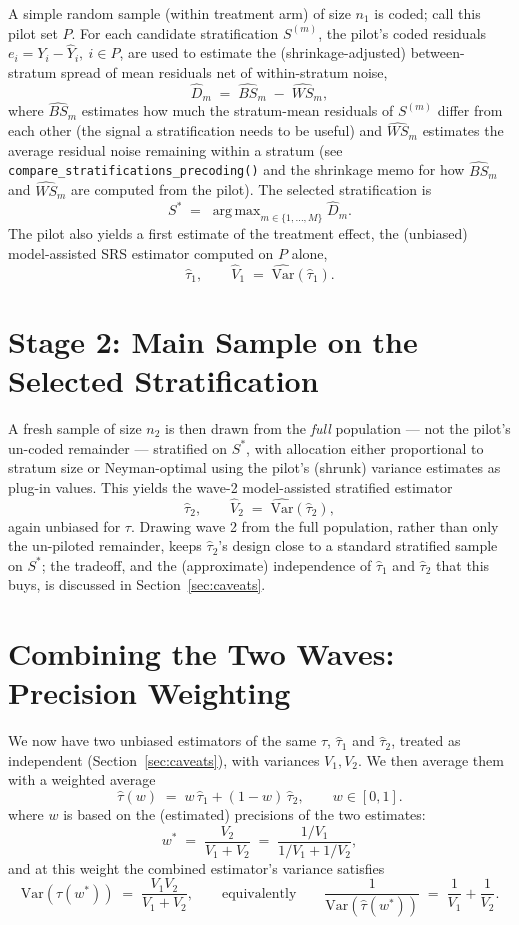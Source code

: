 \documentclass[12pt]{article}
\newcommand{\Var}{\mathrm{Var}}
\newcommand{\tauhat}{\hat\tau}
\DeclareMathOperator*{\argmax}{arg\,max}
\begin{document}
A simple random sample (within treatment arm) of size $n_1$ is coded; call this pilot set $P$.
For each candidate stratification $S^{(m)}$, the pilot's coded residuals $e_i = Y_i - \hat Y_i,\ i \in P$, are used to estimate the (shrinkage-adjusted) between-stratum spread of mean residuals net of within-stratum noise,
\[
  \hat D_m \;=\; \widehat{BS}_m \;-\; \widehat{WS}_m,
\]
where $\widehat{BS}_m$ estimates how much the stratum-mean residuals of $S^{(m)}$ differ from each other (the signal a stratification needs to be useful) and $\widehat{WS}_m$ estimates the average residual noise remaining within a stratum (see \texttt{compare\_stratifications\_precoding()} and the shrinkage memo for how $\widehat{BS}_m$ and $\widehat{WS}_m$ are computed from the pilot).
The selected stratification is
\[
  S^\ast \;=\; \argmax_{m \in \{1,\dots,M\}} \hat D_m .
\]
The pilot also yields a first estimate of the treatment effect, the (unbiased) model-assisted SRS estimator computed on $P$ alone,
\[
  \tauhat_1, \qquad \hat V_1 \;=\; \widehat{\Var}(\tauhat_1).
\]


\section{Stage 2: Main Sample on the Selected Stratification}
\label{sec:stage2}

A fresh sample of size $n_2$ is then drawn from the \emph{full} population --- not the pilot's un-coded remainder --- stratified on $S^\ast$, with allocation either proportional to stratum size or Neyman-optimal using the pilot's (shrunk) variance estimates as plug-in values.
This yields the wave-2 model-assisted stratified estimator
\[
  \tauhat_2, \qquad \hat V_2 \;=\; \widehat{\Var}(\tauhat_2),
\]
again unbiased for $\tau$.
Drawing wave 2 from the full population, rather than only the un-piloted remainder, keeps $\tauhat_2$'s design close to a standard stratified sample on $S^\ast$; the tradeoff, and the (approximate) independence of $\tauhat_1$ and $\tauhat_2$ that this buys, is discussed in Section~\ref{sec:caveats}.


\section{Combining the Two Waves: Precision Weighting}
\label{sec:combine}

We now have two unbiased estimators of the same $\tau$, $\tauhat_1$ and $\tauhat_2$, treated as independent (Section~\ref{sec:caveats}), with variances $V_1, V_2$.
We then average them with a weighted average
\[
  \tauhat(w) \;=\; w\,\tauhat_1 + (1-w)\,\tauhat_2, \qquad w \in [0,1].
\]
where $w$ is based on the (estimated) precisions of the two estimates:
\[
  w^\ast \;=\; \frac{V_2}{V_1 + V_2} \;=\; \frac{1/V_1}{1/V_1 + 1/V_2},
\]
and at this weight the combined estimator's variance satisfies
\[
  \Var(\tauhat(w^\ast)) \;=\; \frac{V_1 V_2}{V_1+V_2}, \qquad\text{equivalently}\qquad
  \frac{1}{\Var(\tauhat(w^\ast))} \;=\; \frac{1}{V_1} + \frac{1}{V_2}.
\]
\end{document}
